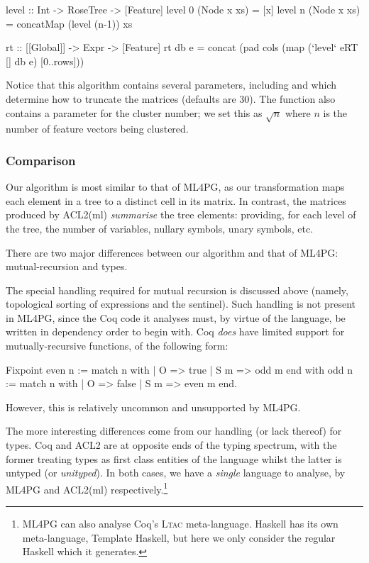 \begin{haskell}
level :: Int -> RoseTree -> [Feature]
level 0 (Node x xs) = [x]
level n (Node x xs) = concatMap (level (n-1)) xs

rt :: [[Global]] -> Expr -> [Feature]
rt db e = concat (pad cols (map (`level` eRT [] db e) [0..rows]))
\end{haskell}

Notice that this algorithm contains several parameters, including  and  which determine how to truncate the matrices (defaults are 30). The  function also contains a parameter for the cluster number; we set this as $\sqrt{n}$ where $n$ is the number of feature vectors being clustered.

\subsubsection{Comparison}

Our algorithm is most similar to that of ML4PG, as our transformation maps each element in a tree to a distinct cell in its matrix. In contrast, the matrices produced by ACL2(ml) \emph{summarise} the tree elements: providing, for each level of the tree, the number of variables, nullary symbols, unary symbols, etc.

There are two major differences between our algorithm and that of ML4PG: mutual-recursion and types.

The special handling required for mutual recursion is discussed above (namely, topological sorting of expressions and the  sentinel). Such handling is not present in ML4PG, since the Coq code it analyses must, by virtue of the language, be written in dependency order to begin with. Coq \emph{does} have limited support for mutually-recursive functions, of the following form:

\begin{coqblock}
Fixpoint even n := match n with
                       | O   => true
                       | S m => odd m
                   end
    with odd  n := match n with
                       | O   => false
                       | S m => even m
                   end.
\end{coqblock}

However, this is relatively uncommon and unsupported by ML4PG.

The more interesting differences come from our handling (or lack thereof) for types. Coq and ACL2 are at opposite ends of the typing spectrum, with the former treating types as first class entities of the language whilst the latter is untyped (or \emph{unityped}). In both cases, we have a \emph{single} language to analyse, by ML4PG and ACL2(ml) respectively.\footnote{ML4PG can also analyse Coq's \textsc{Ltac} meta-language. Haskell has its own meta-language, Template Haskell, but here we only consider the regular Haskell which it generates.}

